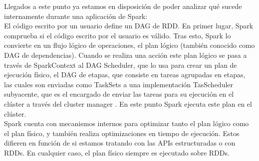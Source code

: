 Llegados a este punto ya estamos en disposición de poder analizar qué sucede internamente durante una aplicación de Spark:\\

El código escrito por un usuario define un DAG de RDD. En primer lugar, Spark comprueba si el código escrito por el usuario es válido. Tras esto, Spark lo convierte en un flujo lógico de operaciones, el plan lógico \cite{6DAGandPE} (también conocido como DAG de dependencias). Cuando se realiza una acción este plan lógico se pasa a través de SparkContext al DAG Scheduler, que lo usa para crear un plan de ejecución físico, el DAG de etapas, que consiste en tareas agrupadas en etapas, las cuales son enviadas como TaskSets a una implementación TasScheduler subyacente, que es el encargado de enviar las tareas para su ejecución en el clúster a través del cluster manager \cite{6DFariDAG}. En este punto Spark ejecuta este plan en el clúster.\\

Spark cuenta con mecanismos internos para optimizar tanto el plan lógico como el plan físico, y también realiza optimizaciones en tiempo de ejecución. Estos difieren en función de si estamos tratando con las APIs estructuradas o con RDDs. En cualquier caso, el plan físico siempre es ejecutado sobre RDDs.
